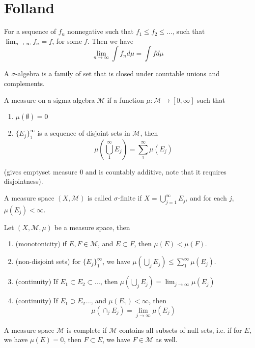 \chapter{Folland}
\begin{thm}
    For a sequence of $f_n$ nonnegative such that $f_1\leq f_2\leq\dots$, such that $\lim_{n\to\infty}f_n=f$, for some $f$. Then we have 
    \begin{equation*}
        \lim_{n\to\infty}\int f_nd\mu=\int fd\mu
    \end{equation*}
\end{thm}

\begin{defn}
    A $\sigma$-algebra is a family of set that is closed under countable unions and complements.
\end{defn}

\begin{defn}[measure]
    A measure on a sigma algebra $\mathcal{M}$ if a function $\mu:\mathcal{M}\to[0,\infty]$ such that 
    \begin{enumerate}
        \item $\mu(\emptyset)=0$
        \item $\{E_j\}_1^\infty$ is a sequence of disjoint sets in $\mathcal{M}$, then 
        \begin{equation*}
            \mu\left(\bigcup_1^\infty E_j\right)=\sum_1^\infty\mu(E_j)
        \end{equation*}
    \end{enumerate}
    (gives emptyset measure 0 and is countably additive, note that it requires disjointness).
\end{defn}
\begin{defn}
    A measure space $(X,\mathcal{M})$ is called $\sigma$-finite if $X=\bigcup_{j=1}^\infty E_j$, and for each $j$, $\mu(E_j)<\infty$.
\end{defn}
\begin{prop}[measure]
    Let $(X,\mathcal{M},\mu)$ be a measure space, then
    \begin{enumerate}
        \item (monotonicity) if $E,F\in\mathcal{M}$, and $E\subset F$, then $\mu(E)<\mu(F)$.
        \item (non-disjoint sets) for $\{E_j\}_1^\infty$, we have $\mu(\bigcup_jE_j)\leq\sum_1^\infty\mu(E_j)$.
        \item (continuity) If $E_1\subset E_2\subset\dots$, then $\mu(\bigcup_jE_j)=\lim_{j\to\infty}\mu(E_j)$
        \item (continuity) If $E_1\supset E_2\dots$, and $\mu(E_1)<\infty$, then 
        \begin{equation*}
            \mu(\cap_jE_j)=\lim_{j\to\infty}\mu(E_j)
        \end{equation*}
    \end{enumerate}
\end{prop}
\begin{defn}
    A measure space $\mathcal{M}$ is complete if $\mathcal{M}$ contains all subsets of null sets, i.e. if for $E$, we have $\mu(E)=0$, then $F\subset E$, we have $F\in\mathcal{M}$ as well.
\end{defn}
